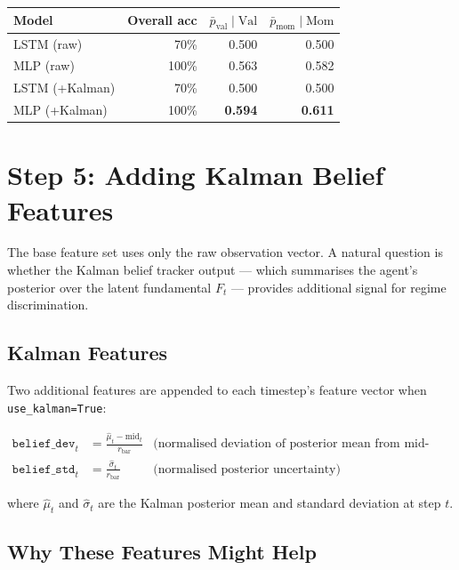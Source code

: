 \documentclass[11pt]{article}
\begin{document}
\begin{center}
\begin{tabular}{lrrr}
\toprule
\textbf{Model} & \textbf{Overall acc} & $\bar{p}_\text{val}\mid\text{Val}$ & $\bar{p}_\text{mom}\mid\text{Mom}$ \\
\midrule
LSTM (raw)         & 70\% & 0.500 & 0.500 \\
MLP  (raw)         & 100\% & 0.563 & 0.582 \\
LSTM (+Kalman)     & 70\% & 0.500 & 0.500 \\
MLP  (+Kalman)     & 100\% & \textbf{0.594} & \textbf{0.611} \\
\bottomrule
\end{tabular}
\end{center}

\section{Step 5: Adding Kalman Belief Features}

The base feature set uses only the raw observation vector.  A natural question
is whether the Kalman belief tracker output --- which summarises the agent's
posterior over the latent fundamental $F_t$ --- provides additional signal for
regime discrimination.

\subsection{Kalman Features}

Two additional features are appended to each timestep's feature vector when
\texttt{use\_kalman=True}:

\begin{align*}
  \texttt{belief\_dev}_t &= \frac{\hat{\mu}_t - \text{mid}_t}{r_\text{bar}}
  & \text{(normalised deviation of posterior mean from mid-price)} \\
  \texttt{belief\_std}_t &= \frac{\hat{\sigma}_t}{r_\text{bar}}
  & \text{(normalised posterior uncertainty)}
\end{align*}

\noindent
where $\hat{\mu}_t$ and $\hat{\sigma}_t$ are the Kalman posterior mean and
standard deviation at step $t$.

\subsection{Why These Features Might Help}
\end{document}
